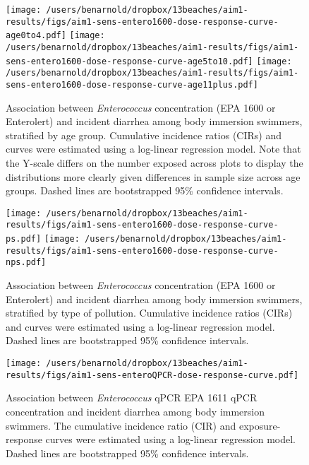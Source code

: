 \documentclass[12pt]{article}\usepackage[]{graphicx}\usepackage[]{color}
\begin{document}
\begin{landscape}
\begin{figure}[h!tb]
\begin{center}
\texttt{[image: /users/benarnold/dropbox/13beaches/aim1-results/figs/aim1-sens-entero1600-dose-response-curve-age0to4.pdf]}
\texttt{[image: /users/benarnold/dropbox/13beaches/aim1-results/figs/aim1-sens-entero1600-dose-response-curve-age5to10.pdf]}
\texttt{[image: /users/benarnold/dropbox/13beaches/aim1-results/figs/aim1-sens-entero1600-dose-response-curve-age11plus.pdf]}
\caption{Association between \emph{Enterococcus} concentration (EPA 1600 or Enterolert) and incident diarrhea among body immersion swimmers, stratified by age group. Cumulative incidence ratios (CIRs) and curves were estimated using a log-linear regression model. Note that the Y-scale differs on the number exposed across plots to display the distributions more clearly given differences in sample size across age groups. Dashed lines are bootstrapped 95\% confidence intervals.  \label{fig:entero1600agecurve}}
\end{center}
\end{figure}
\end{landscape}

\begin{landscape}
\begin{figure}[h!tb]
\begin{center}
\texttt{[image: /users/benarnold/dropbox/13beaches/aim1-results/figs/aim1-sens-entero1600-dose-response-curve-ps.pdf]}
\texttt{[image: /users/benarnold/dropbox/13beaches/aim1-results/figs/aim1-sens-entero1600-dose-response-curve-nps.pdf]}
\caption{Association between \emph{Enterococcus} concentration (EPA 1600 or Enterolert) and incident diarrhea among body immersion swimmers, stratified by type of pollution. Cumulative incidence ratios (CIRs) and curves were estimated using a log-linear regression model. Dashed lines are bootstrapped 95\% confidence intervals.  \label{fig:entero1600pscurve}}
\end{center}
\end{figure}
\end{landscape}



\begin{figure}[h!tb]
\begin{center}
\texttt{[image: /users/benarnold/dropbox/13beaches/aim1-results/figs/aim1-sens-enteroQPCR-dose-response-curve.pdf]}
\caption{Association between \emph{Enterococcus} qPCR EPA 1611 qPCR concentration and incident diarrhea among body immersion swimmers. The cumulative incidence ratio (CIR) and exposure-response curves were estimated using a log-linear regression model.  Dashed lines are bootstrapped 95\% confidence intervals. \label{fig:enteroQPCRcurve}}
\end{center}
\end{figure}
\end{document}
